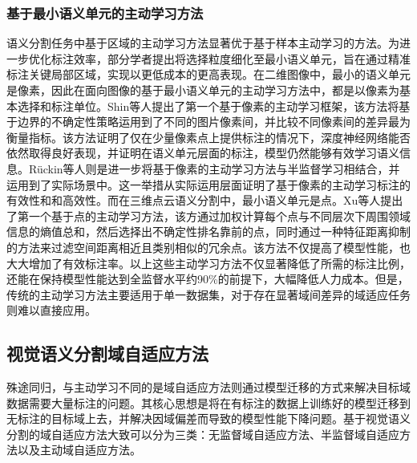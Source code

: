 \subsubsection{基于最小语义单元的主动学习方法}
语义分割任务中基于区域的主动学习方法显著优于基于样本主动学习的方法。为进一步优化标注效率，部分学者提出将选择粒度细化至最小语义单元，旨在通过精准标注关键局部区域，实现以更低成本的更高表现。在二维图像中，最小的语义单元是像素，因此在面向图像的基于最小语义单元的主动学习方法中，都是以像素为基本选择和标注单位。Shin等人提出了第一个基于像素的主动学习框架，该方法将基于边界的不确定性策略运用到了不同的图片像素间，并比较不同像素间的差异最为衡量指标。该方法证明了仅在少量像素点上提供标注的情况下，深度神经网络能否依然取得良好表现，并证明在语义单元层面的标注，模型仍然能够有效学习语义信息。Rückin等人则是进一步将基于像素的主动学习方法与半监督学习相结合，并运用到了实际场景中。这一举措从实际运用层面证明了基于像素的主动学习标注的有效性和和高效性。而在三维点云语义分割中，最小语义单元是点。Xu等人提出了第一个基于点的主动学习方法，该方通过加权计算每个点与不同层次下周围领域信息的熵值总和，然后选择出不确定性排名靠前的点，同时通过一种特征距离抑制的方法来过滤空间距离相近且类别相似的冗余点。该方法不仅提高了模型性能，也大大增加了有效标注率。以上这些主动学习方法不仅显著降低了所需的标注比例，还能在保持模型性能达到全监督水平约90\%的前提下，大幅降低人力成本。但是，传统的主动学习方法主要适用于单一数据集，对于存在显著域间差异的域适应任务则难以直接应用。
\subsection{视觉语义分割域自适应方法}
殊途同归，与主动学习不同的是域自适应方法则通过模型迁移的方式来解决目标域数据需要大量标注的问题。其核心思想是将在有标注的数据上训练好的模型迁移到无标注的目标域上去，并解决因域偏差而导致的模型性能下降问题。基于视觉语义分割的域自适应方法大致可以分为三类：无监督域自适应方法、半监督域自适应方法以及主动域自适应方法。

